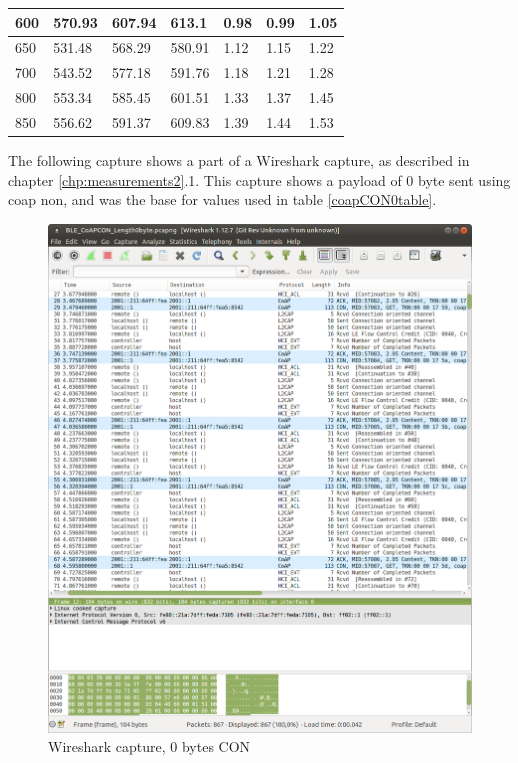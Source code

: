 \begin{table}[H]
\begin{tabular}{|l|l|l|l|l|l|l|}
600              & 570.93               & 607.94               & 613.1                & 0.98              & 0.99              & 1.05              \\ \hline
650              & 531.48               & 568.29               & 580.91               & 1.12              & 1.15              & 1.22              \\ \hline
700              & 543.52               & 577.18               & 591.76               & 1.18              & 1.21              & 1.28              \\ \hline
800              & 553.34               & 585.45               & 601.51               & 1.33              & 1.37              & 1.45              \\ \hline
850              & 556.62               & 591.37               & 609.83               & 1.39              & 1.44              & 1.53              \\ \hline
\end{tabular}
\end{table}


\newpage
The following capture shows a part of a Wireshark capture, as described in chapter \ref{chp:measurements2}.1. This capture shows a \gls{payload} of 0 byte sent using \gls{coap} \gls{non}, and was the base for values used in table \ref{coapCON0table}. 

\begin{figure}[ht]
    \centering
    \includegraphics[width=1.0\textwidth]{0byteCONwireshark.png}    
    \caption{Wireshark capture, 0 bytes CON}
    \label{fig:wireshark0byteCONappendixB}
\end{figure}

